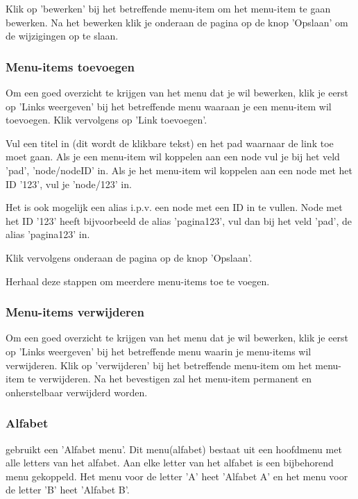 Klik op 'bewerken' bij het betreffende menu-item om het menu-item te gaan bewerken. Na het bewerken klik je onderaan de pagina op de knop 'Opslaan' om de wijzigingen op te slaan.


\subsubsection{Menu-items toevoegen}\label{menuitemstoevoegen}

Om een goed overzicht te krijgen van het menu dat je wil bewerken, klik je eerst op 'Links weergeven' bij het betreffende menu waaraan je een menu-item wil toevoegen. Klik vervolgens op 'Link toevoegen'. 

Vul een titel in (dit wordt de klikbare tekst) en het pad waarnaar de link toe moet gaan. Als je een menu-item wil koppelen aan een node vul je bij het veld 'pad', 'node/nodeID' in. Als je het menu-item wil koppelen aan een node met het ID '123', vul je 'node/123' in. 

Het is ook mogelijk een alias i.p.v. een node met een ID in te vullen. Node met het ID '123' heeft bijvoorbeeld de alias 'pagina123', vul dan bij het veld 'pad', de alias 'pagina123' in. 

Klik vervolgens onderaan de pagina op de knop 'Opslaan'.

Herhaal deze stappen om meerdere menu-items toe te voegen.  

\subsubsection{Menu-items verwijderen}\label{menuitemsverwijderen}

Om een goed overzicht te krijgen van het menu dat je wil bewerken, klik je eerst op 'Links weergeven' bij het betreffende menu waarin je menu-items wil verwijderen. Klik op 'verwijderen' bij het betreffende menu-item om het menu-item te verwijderen. Na het bevestigen zal het menu-item permanent en onherstelbaar verwijderd worden.


\subsubsection{Alfabet}\label{alfabet}

\drupalpath gebruikt een 'Alfabet menu'. Dit menu(alfabet) bestaat uit een hoofdmenu met alle letters van het alfabet. Aan elke letter van het alfabet is een bijbehorend menu gekoppeld. Het menu voor de letter 'A' heet 'Alfabet A' en het menu voor de letter 'B' heet 'Alfabet B'.

